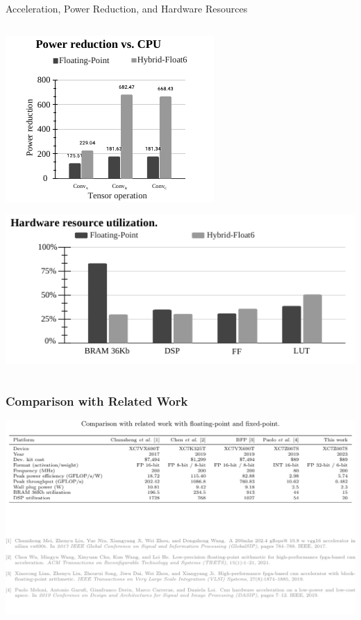 \begin{frame}{Acceleration, Power Reduction, and Hardware Resources}
\begin{columns}[T]
\begin{column}{0.5\textwidth}
			\includegraphics[width=0.5\linewidth]{slides/figures/power_reduction_vs_cpu.pdf} %
			\pause %
			
			\includegraphics[width=0.8\linewidth]{slides/figures/resource_utilization.pdf} %
		\end{column}
	\end{columns}
\end{frame}

\begin{frame}
	\frametitle{Comparison with Related Work} %
	\begin{center}
		\includegraphics[width=\textwidth]{slides/figures/cnn_related_work.pdf} %
	\end{center}
\end{frame}